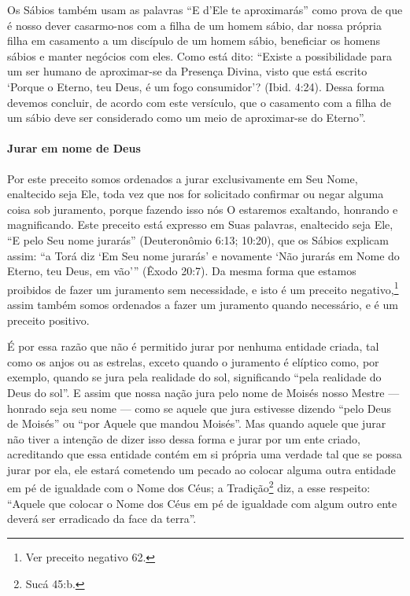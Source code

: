 Os Sábios também usam as palavras ``E d'Ele te aproximarás'' como prova
de que é nosso dever casarmo-nos com a filha de um homem sábio, dar
nossa própria filha em casamento a um discípulo de um homem sábio,
beneficiar os homens sábios e manter negócios com eles. Como está dito:
``Existe a possibilidade para um ser humano de aproximar-se da Presença
Divina, visto que está escrito `Porque o Eterno, teu Deus, é um fogo
consumidor'? (Ibid. 4:24). Dessa forma devemos concluir, de acordo com
este versículo, que o casamento com a filha de um sábio deve ser
considerado como um meio de aproximar-se do Eterno''.

\paragraph{Jurar em nome de Deus}

Por este preceito somos ordenados a jurar exclusivamente em Seu Nome,
enaltecido seja Ele, toda vez que nos for solicitado confirmar ou negar
alguma coisa sob juramento, porque fazendo isso nós O estaremos
exaltando, honrando e magnificando. Este preceito está expresso em Suas
palavras, enaltecido seja Ele, ``E pelo Seu nome jurarás''
(Deuteronômio 6:13; 10:20), que os Sábios explicam assim: ``a Torá diz
`Em Seu nome jurarás' e novamente `Não jurarás em Nome do Eterno, teu
Deus, em vão''' (Êxodo 20:7). Da mesma forma que estamos proibidos de
fazer um juramento sem necessidade, e isto é um preceito
negativo,\footnote{Ver preceito negativo 62.} assim também somos ordenados a fazer um
juramento quando necessário, e é um preceito positivo.

É por essa razão que não é permitido jurar por nenhuma entidade criada,
tal como os anjos ou as estrelas, exceto quando o juramento é elíptico
como, por exemplo, quando se jura pela realidade do sol, significando
``pela realidade do Deus do sol''. E assim que nossa nação jura pelo
nome de Moisés nosso Mestre --- honrado seja seu nome --- como se aquele
que jura estivesse dizendo ``pelo Deus de Moisés'' ou ``por Aquele que
mandou Moisés''. Mas quando aquele que jurar não tiver a intenção de
dizer isso dessa forma e jurar por um ente criado, acreditando que essa
entidade contém em si própria uma verdade tal que se possa jurar por
ela, ele estará cometendo um pecado ao colocar alguma outra entidade em
pé de igualdade com o Nome dos Céus; a Tradição\footnote{Sucá 45:b.}
diz, a esse respeito: ``Aquele que colocar o Nome dos Céus em pé de
igualdade com algum outro ente deverá ser erradicado da face da terra''.


